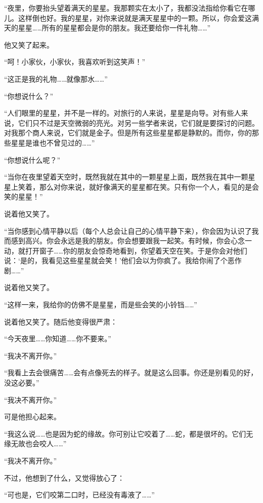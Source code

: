 “夜里，你要抬头望着满天的星星。我那颗实在太小了，我都没法指给你看它在哪儿。这样倒也好。我的星星，对你来说就是满天星星中的一颗。所以，你会爱这满天的星星\ldots{}\ldots{}所有的星星都会是你的朋友。我还要给你一件礼物\ldots{}\ldots{}”

他又笑了起来。

“呵！小家伙，小家伙，我喜欢听到这笑声！”

“这正是我的礼物\ldots{}\ldots{}就像那水\ldots{}\ldots{}”

“你想说什么？”

“人们眼里的星星，并不是一样的。对旅行的人来说，星星是向导。对有些人来说，它们只不过是天空微弱的亮光。对另一些学者来说，它们就是要探讨的问题。对我那个商人来说，它们就是金子。但是所有这些星星都是静默的。而你，你的那些星星是谁也不曾见过的\ldots{}\ldots{}”

“你想说什么呢？”

“当你在夜里望着天空时，既然我就在其中的一颗星星上面，既然我在其中一颗星星上笑着，那么对你来说，就好像满天的星星都在笑。只有你一个人，看见的是会笑的星星！”

说着他又笑了。

“当你感到心情平静以后（每个人总会让自己的心情平静下来），你会因为认识了我而感到高兴。你会永远是我的朋友。你会想要跟我一起笑。有时候，你会心念一动，就打开窗子\ldots{}\ldots{}你的朋友会惊奇地看到，你望着天空在笑。于是你会对他们说：‘是的，我看见这些星星就会笑！'他们会以为你疯了。我给你闹了个恶作剧\ldots{}\ldots{}”

说着他又笑了。

“这样一来，我给你的仿佛不是星星，而是些会笑的小铃铛\ldots{}\ldots{}”

说着他又笑了。随后他变得很严肃：

“今天夜里\ldots{}\ldots{}你知道\ldots{}\ldots{}你不要来。”

“我决不离开你。”

“我看上去会很痛苦\ldots{}\ldots{}会有点像死去的样子。就是这么回事。你还是别看见的好，没这必要。”

“我决不离开你。”

可是他担心起来。

“我这么说\ldots{}\ldots{}也是因为蛇的缘故。你可别让它咬着了\ldots{}\ldots{}蛇，都是很坏的。它们无缘无故也会咬人\ldots{}\ldots{}”

“我决不离开你。”

不过，他想到了什么，又觉得放心了：

“可也是，它们咬第二口时，已经没有毒液了\ldots{}\ldots{}”

{\startalignment[center]
 \stopalignment}

